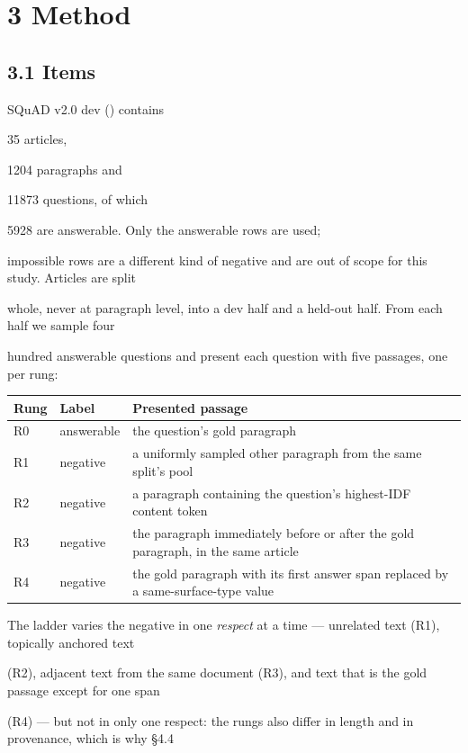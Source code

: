 \section{3 Method}
\subsection{3.1 Items}
SQuAD v2.0 dev (\citep{know-what-you-don-t-know-unanswerable-questions-for-squad}) contains

35 articles,

1204 paragraphs and

11873 questions, of which

5928 are answerable. Only the answerable rows are used;

impossible rows are a different kind of negative and are out of scope for this study. Articles are split

whole, never at paragraph level, into a dev half and a held-out half. From each half we sample four

hundred answerable questions and present each question with five passages, one per rung:

\begin{table}[t]
\centering
\scriptsize
  \begin{tabularx}{\textwidth}{lXX}
    \toprule
    Rung & Label & Presented passage \\
\midrule
    R0 & answerable & the question's gold paragraph \\
    R1 & negative & a uniformly sampled other paragraph from the same split's pool \\
    R2 & negative & a paragraph containing the question's highest-IDF content token \\
    R3 & negative & the paragraph immediately before or after the gold paragraph, in the same article \\
    R4 & negative & the gold paragraph with its first answer span replaced by a same-surface-type value \\
    \bottomrule
  \end{tabularx}
\end{table}
The ladder varies the negative in one \textit{respect} at a time --- unrelated text (R1), topically anchored text

(R2), adjacent text from the same document (R3), and text that is the gold passage except for one span

(R4) --- but not in only one respect: the rungs also differ in length and in provenance, which is why §4.4

